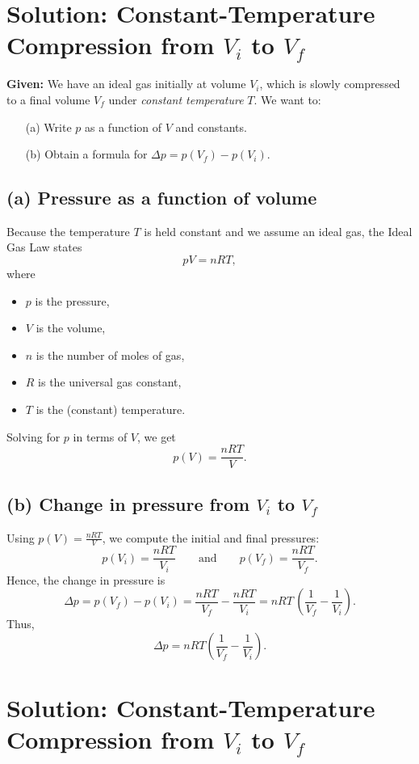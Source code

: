 \documentclass[12pt]{article}
\theoremstyle{definition} %
\theoremstyle{plain} %
\begin{document}
\section*{Solution: Constant-Temperature Compression from $V_i$ to $V_f$}

\noindent
\textbf{Given:} We have an ideal gas initially at volume $V_i$, which is slowly compressed to a final volume $V_f$ under \emph{constant temperature} $T$. 
We want to:
\begin{enumerate}
    \item[(a)] Write $p$ as a function of $V$ and constants.
    \item[(b)] Obtain a formula for $\Delta p = p(V_f) - p(V_i)$.
\end{enumerate}

\subsection*{(a) Pressure as a function of volume}

\noindent
Because the temperature $T$ is held constant and we assume an ideal gas, the Ideal Gas Law states
\[
pV = nRT,
\]
where 
\begin{itemize}
    \item $p$ is the pressure,
    \item $V$ is the volume,
    \item $n$ is the number of moles of gas,
    \item $R$ is the universal gas constant,
    \item $T$ is the (constant) temperature.
\end{itemize}

\noindent
Solving for $p$ in terms of $V$, we get
\[
\boxed{p(V) = \frac{nRT}{V}.}
\]

\subsection*{(b) Change in pressure from $V_i$ to $V_f$}

\noindent
Using $p(V) = \tfrac{nRT}{V}$, we compute the initial and final pressures:
\[
p(V_i) = \frac{nRT}{V_i}
\quad\quad\text{and}\quad\quad
p(V_f) = \frac{nRT}{V_f}.
\]
Hence, the change in pressure is
\[
\Delta p = p(V_f) - p(V_i)
= \frac{nRT}{V_f} - \frac{nRT}{V_i}
= nRT \,\left(\frac{1}{V_f} - \frac{1}{V_i}\right).
\]
Thus,
\[
\boxed{\Delta p
= nRT\left(\frac{1}{V_f} - \frac{1}{V_i}\right).
}
\]

\section*{Solution: Constant-Temperature Compression from $V_i$ to $V_f$}
\end{document}
